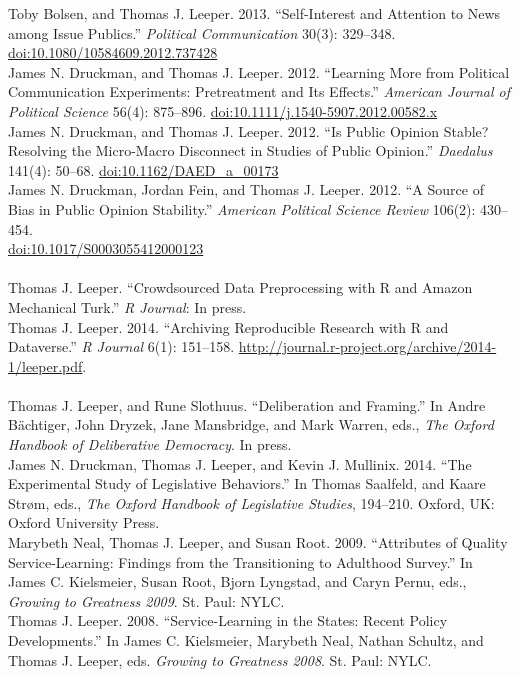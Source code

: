 \documentclass[12pt]{article}
\newcommand{\topic}[1]{\pagebreak[3]\indent {\color{lg}{\footnotesize #1 }}\\}
\newcommand{\entry}[1]{\indent {\color{lg}\guillemotright}\hspace{2pt}#1\vspace{.25em}\\}
\begin{document}
	\entry{Toby Bolsen, and Thomas J. Leeper. 2013. ``Self-Interest and Attention to News among Issue Publics.'' \textit{Political Communication} 30(3): 329--348.\\ \href{http://dx.doi.org/10.1080/10584609.2012.737428}{doi:10.1080/10584609.2012.737428}}
	\entry{James N. Druckman, and Thomas J. Leeper. 2012. ``Learning More from Political Communication Experiments: Pretreatment and Its Effects.'' \textit{American Journal of Political Science} 56(4): 875--896. \href{http://dx.doi.org/10.1111/j.1540-5907.2012.00582.x}{doi:10.1111/j.1540-5907.2012.00582.x}}
	\entry{James N. Druckman, and Thomas J. Leeper. 2012. ``Is Public Opinion Stable? Resolving the Micro-Macro Disconnect in Studies of Public Opinion.'' \textit{Daedalus} 141(4): 50--68. \href{http://dx.doi.org/10.1162/DAED\_a\_00173}{doi:10.1162/DAED\_a\_00173}}
	\entry{James N. Druckman, Jordan Fein, and Thomas J. Leeper. 2012. ``A Source of Bias in Public Opinion Stability.'' \textit{American Political Science Review} 106(2): 430--454.\\ \href{http://dx.doi.org/10.1017/S0003055412000123}{doi:10.1017/S0003055412000123}}
\topic{Peer-Reviewed Publications: Software}
	\entry{Thomas J. Leeper. ``Crowdsourced Data Preprocessing with R and Amazon Mechanical Turk.'' \textit{R Journal}: In press.}
	\entry{Thomas J. Leeper. 2014. ``Archiving Reproducible Research with R and Dataverse.'' \textit{R Journal} 6(1): 151--158. \href{http://journal.r-project.org/archive/2014-1/leeper.pdf}{http://journal.r-project.org/archive/2014-1/leeper.pdf}.}
\topic{Chapters in Edited Volumes}
	\entry{Thomas J. Leeper, and Rune Slothuus. ``Deliberation and Framing.'' In Andre B{\"a}chtiger, John Dryzek, Jane Mansbridge, and Mark Warren, eds., \textit{The Oxford Handbook of Deliberative Democracy}. In press.}
	\entry{James N. Druckman, Thomas J. Leeper, and Kevin J. Mullinix. 2014. ``The Experimental Study of Legislative Behaviors.'' In Thomas Saalfeld, and Kaare Str\o m, eds., \textit{The Oxford Handbook of Legislative Studies}, 194--210. Oxford, UK: Oxford University Press.}
	\entry{Marybeth Neal, Thomas J. Leeper, and Susan Root. 2009. ``Attributes of Quality Service-Learning: Findings from the Transitioning to Adulthood Survey.'' In James C. Kielsmeier, Susan Root, Bjorn Lyngstad, and Caryn Pernu, eds., \textit{Growing to Greatness 2009}. St. Paul: NYLC.}
	\entry{Thomas J. Leeper. 2008. ``Service-Learning in the States: Recent Policy Developments.'' In James C. Kielsmeier, Marybeth Neal, Nathan Schultz, and Thomas J. Leeper, eds. \textit{Growing to Greatness 2008}. St. Paul: NYLC.}
\end{document}
